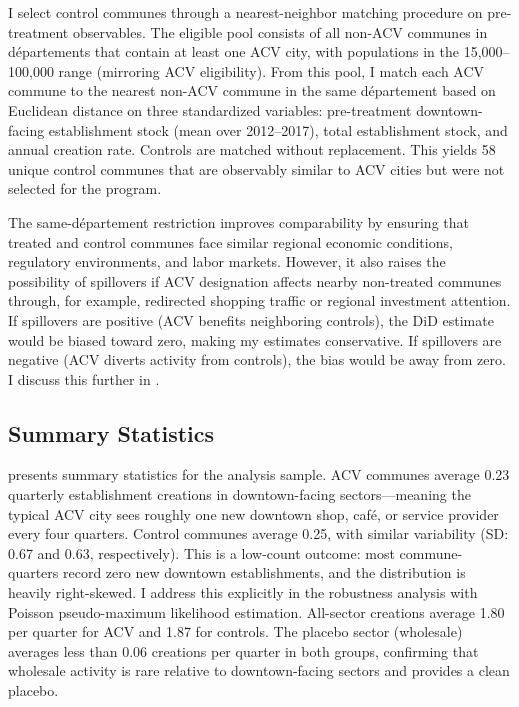 \documentclass[12pt]{article}
\begin{document}
I select control communes through a nearest-neighbor matching procedure on pre-treatment observables. The eligible pool consists of all non-ACV communes in d\'epartements that contain at least one ACV city, with populations in the 15,000--100,000 range (mirroring ACV eligibility). From this pool, I match each ACV commune to the nearest non-ACV commune in the same d\'epartement based on Euclidean distance on three standardized variables: pre-treatment downtown-facing establishment stock (mean over 2012--2017), total establishment stock, and annual creation rate. Controls are matched without replacement. This yields 58 unique control communes that are observably similar to ACV cities but were not selected for the program.

The same-d\'epartement restriction improves comparability by ensuring that treated and control communes face similar regional economic conditions, regulatory environments, and labor markets. However, it also raises the possibility of spillovers if ACV designation affects nearby non-treated communes through, for example, redirected shopping traffic or regional investment attention. If spillovers are positive (ACV benefits neighboring controls), the DiD estimate would be biased toward zero, making my estimates conservative. If spillovers are negative (ACV diverts activity from controls), the bias would be away from zero. I discuss this further in .

\subsection{Summary Statistics}

 presents summary statistics for the analysis sample. ACV communes average 0.23 quarterly establishment creations in downtown-facing sectors---meaning the typical ACV city sees roughly one new downtown shop, caf\'e, or service provider every four quarters. Control communes average 0.25, with similar variability (SD: 0.67 and 0.63, respectively). This is a low-count outcome: most commune-quarters record zero new downtown establishments, and the distribution is heavily right-skewed. I address this explicitly in the robustness analysis with Poisson pseudo-maximum likelihood estimation. All-sector creations average 1.80 per quarter for ACV and 1.87 for controls. The placebo sector (wholesale) averages less than 0.06 creations per quarter in both groups, confirming that wholesale activity is rare relative to downtown-facing sectors and provides a clean placebo.
\end{document}
